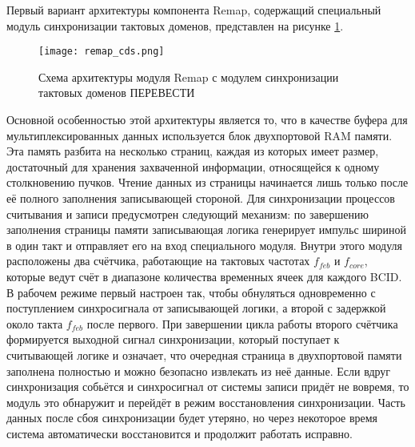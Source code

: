 Первый вариант архитектуры компонента Remap, содержащий специальный модуль синхронизации тактовых доменов, представлен на рисунке \ref{fig:remap_cds}.\par
\begin{figure}[ht]
    \centering
    \texttt{[image: remap\_cds.png]}
    \caption{Схема архитектуры модуля Remap с модулем синхронизации тактовых доменов ПЕРЕВЕСТИ}
    \label{fig:remap_cds}
\end{figure}\par
Основной особенностью этой архитектуры является то, что в качестве буфера для мультиплексированных данных используется блок двухпортовой RAM памяти. Эта память разбита на несколько страниц, каждая из которых имеет размер, достаточный для хранения захваченной информации, относящейся к одному столкновению пучков. Чтение данных из страницы начинается лишь только после её полного заполнения записывающей стороной. Для синхронизации процессов считывания и записи предусмотрен следующий механизм: по завершению заполнения страницы памяти записывающая логика генерирует импульс шириной в один такт и отправляет его на вход специального модуля. Внутри этого модуля расположены два счётчика, работающие на тактовых частотах $f_{feb}$ и $f_{core}$, которые ведут счёт в диапазоне количества временных ячеек для каждого BCID. В рабочем режиме первый настроен так, чтобы обнуляться одновременно с поступлением синхросигнала от записывающей логики, а второй с задержкой около такта $f_{feb}$ после первого. При завершении цикла работы второго счётчика формируется выходной сигнал синхронизации, который поступает к считывающей логике и означает, что очередная страница в двухпортовой памяти заполнена полностью и можно безопасно извлекать из неё данные. Если вдруг синхронизация собьётся и синхросигнал от системы записи придёт не вовремя, то модуль это обнаружит и перейдёт в режим восстановления синхронизации. Часть данных после сбоя синхронизации будет утеряно, но через некоторое время система автоматически восстановится и продолжит работать исправно.\par
